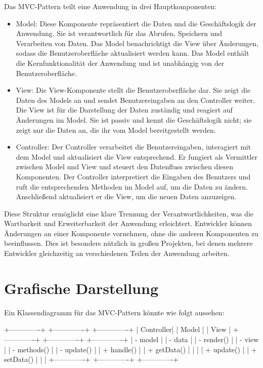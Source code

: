 Das MVC-Pattern teilt eine Anwendung in drei Hauptkomponenten:
\begin{itemize}

\item Model: Diese Komponente repräsentiert die Daten und die Geschäftslogik der Anwendung. Sie ist verantwortlich für das Abrufen, Speichern und Verarbeiten von Daten. Das Model benachrichtigt die View über Änderungen, sodass die Benutzeroberfläche aktualisiert werden kann. Das Model enthält die Kernfunktionalität der Anwendung und ist unabhängig von der Benutzeroberfläche.

\item View: Die View-Komponente stellt die Benutzeroberfläche dar. Sie zeigt die Daten des Models an und sendet Benutzereingaben an den Controller weiter. Die View ist für die Darstellung der Daten zuständig und reagiert auf Änderungen im Model. Sie ist passiv und kennt die Geschäftslogik nicht; sie zeigt nur die Daten an, die ihr vom Model bereitgestellt werden.

\item Controller: Der Controller verarbeitet die Benutzereingaben, interagiert mit dem Model und aktualisiert die View entsprechend. Er fungiert als Vermittler zwischen Model und View und steuert den Datenfluss zwischen diesen Komponenten. Der Controller interpretiert die Eingaben des Benutzers und ruft die entsprechenden Methoden im Model auf, um die Daten zu ändern. Anschließend aktualisiert er die View, um die neuen Daten anzuzeigen.

\end{itemize}
Diese Struktur ermöglicht eine klare Trennung der Verantwortlichkeiten, was die Wartbarkeit und Erweiterbarkeit der Anwendung erleichtert. Entwickler können Änderungen an einer Komponente vornehmen, ohne die anderen Komponenten zu beeinflussen. Dies ist besonders nützlich in großen Projekten, bei denen mehrere Entwickler gleichzeitig an verschiedenen Teilen der Anwendung arbeiten.

\section{Grafische Darstellung}

Ein Klassendiagramm für das MVC-Pattern könnte wie folgt aussehen:

+-------------+       +-------------+       +-------------+
|   Controller|       |     Model   |       |     View    |
+-------------+       +-------------+       +-------------+
| - model     |       | - data      |       | - render()  |
| - view      |       | - methods() |       | - update()  |
| + handle()  |       | + getData() |       |             |
| + update()  |       | + setData() |       |             |
+-------------+       +-------------+       +-------------+

